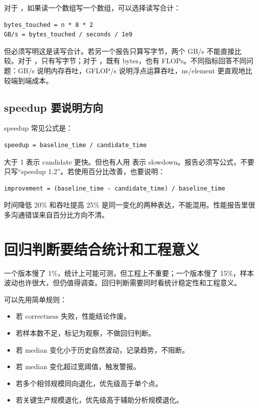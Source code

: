 对于 ，如果读一个数组写一个数组，可以选择读写合计：

\begin{lstlisting}
bytes_touched = n * 8 * 2
GB/s = bytes_touched / seconds / 1e9
\end{lstlisting}

但必须写明这是读写合计。若另一个报告只算写字节，两个 GB/s 不能直接比较。对于 ，只有写字节；对于 ，既有 bytes，也有 FLOPs。不同指标回答不同问题：GB/s 说明内存吞吐，GFLOP/s 说明浮点运算吞吐，ns/element 更直观地比较端到端成本。

\subsection{speedup 要说明方向}

speedup 常见公式是：

\begin{lstlisting}
speedup = baseline_time / candidate_time
\end{lstlisting}

大于 1 表示 candidate 更快。但也有人用  表示 slowdown。报告必须写公式，不要只写“speedup 1.2”。若使用百分比改善，也要说明：

\begin{lstlisting}
improvement = (baseline_time - candidate_time) / baseline_time
\end{lstlisting}

时间降低 20\% 和吞吐提高 25\% 是同一变化的两种表达，不能混用。性能报告里很多沟通错误来自百分比方向不清。

\section{回归判断要结合统计和工程意义}

一个版本慢了 1\%，统计上可能可测，但工程上不重要；一个版本慢了 15\%，样本波动也许很大，但仍值得调查。回归判断需要同时看统计稳定性和工程意义。

可以先用简单规则：

\begin{itemize}
  \item 若 correctness 失败，性能结论作废。
  \item 若样本数不足，标记为观察，不做回归判断。
  \item 若 median 变化小于历史自然波动，记录趋势，不阻断。
  \item 若 median 变化超过宽阈值，触发警报。
  \item 若多个相邻规模同向退化，优先级高于单个点。
  \item 若关键生产规模退化，优先级高于辅助分析规模退化。
\end{itemize}

